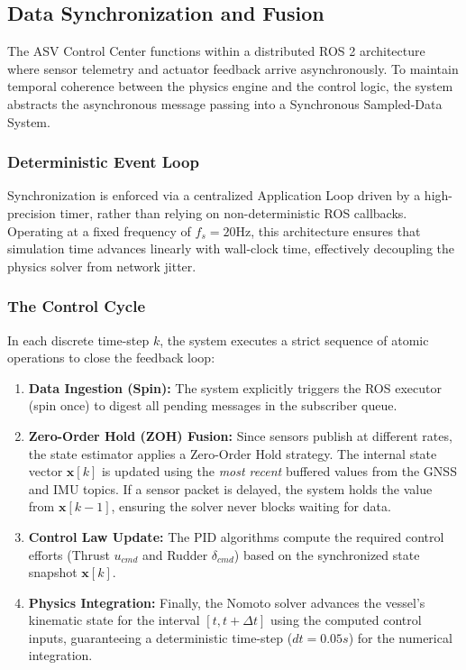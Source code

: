 \documentclass[12pt, a4paper, oneside]{report}
\begin{document}
\subsection{Data Synchronization and Fusion}
The ASV Control Center functions within a distributed ROS 2 architecture where sensor telemetry and actuator feedback arrive asynchronously. To maintain temporal coherence between the physics engine and the control logic, the system abstracts the asynchronous message passing into a Synchronous Sampled-Data System.

\subsubsection{Deterministic Event Loop}
Synchronization is enforced via a centralized Application Loop driven by a high-precision timer, rather than relying on non-deterministic ROS callbacks. Operating at a fixed frequency of $f_s = 20\text{Hz}$, this architecture ensures that simulation time advances linearly with wall-clock time, effectively decoupling the physics solver from network jitter.

\subsubsection{The Control Cycle}
In each discrete time-step $k$, the system executes a strict sequence of atomic operations to close the feedback loop:

\begin{enumerate}
    \item \textbf{Data Ingestion (Spin):} The system explicitly triggers the ROS executor (spin once) to digest all pending messages in the subscriber queue.
    
    \item \textbf{Zero-Order Hold (ZOH) Fusion:} 
    Since sensors publish at different rates, the state estimator applies a Zero-Order Hold strategy. The internal state vector $\mathbf{x}[k]$ is updated using the \textit{most recent} buffered values from the GNSS and IMU topics. If a sensor packet is delayed, the system holds the value from $\mathbf{x}[k-1]$, ensuring the solver never blocks waiting for data.
    
    \item \textbf{Control Law Update:} 
    The PID algorithms compute the required control efforts (Thrust $u_{cmd}$ and Rudder $\delta_{cmd}$) based on the synchronized state snapshot $\mathbf{x}[k]$.
    
    \item \textbf{Physics Integration:} 
    Finally, the Nomoto solver advances the vessel's kinematic state for the interval $[t, t + \Delta t]$ using the computed control inputs, guaranteeing a deterministic time-step ($dt = 0.05s$) for the numerical integration.
\end{enumerate}
\end{document}
